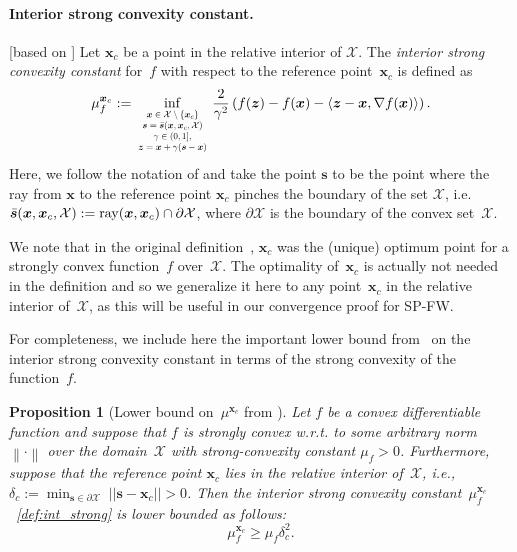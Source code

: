 \documentclass[twoside]{article}
\newcommand{\X}{\mathcal{X}}
\newcommand{\prodscal}[2]{\left\langle#1,#2\right\rangle}
\newcommand{\x}{\bm{x}}
\newcommand{\z}{\bm{z}}
\newcommand{\s}{\bm{s}}
\newtheorem{proposition}[definition]{Proposition}
\providecommand{\norm}[1]{\left\lVert#1\right\rVert}
\newcommand{\xc}{\x_c} %
\newcommand{\0}{\mathbf{0}} %
\begin{document}
  \paragraph{Interior strong convexity constant.} %
  \label{par:interior_strong_convexity_constant_}
  [based on ]
  Let $\xc$ be a point in the relative interior of $\X$.
   The \emph{interior strong convexity constant} for~$f$ with respect to the reference point~$\xc$ is defined as
    \begin{equation}
  \label{def:int_strong}
    \mu^{\xc}_f :=  \inf_{\substack{\scalebox{0.65}{
        $\begin{matrix}
                  \x \in \X \setminus \{\xc\} \\
                  \s = \bar{\s}(\x,\xc,\X) \\
                  \gamma \in (0,1], \\
                  \z = \x + \gamma(\s-\x)
        \end{matrix}$
        }}}
       \frac{2}{\gamma^2} \left(f(\z)-f(\x)- \prodscal{\z-\x}{ \nabla f(\x)}\right).
       \end{equation}
  Here, we follow the notation of  and take the point $\s$ to be the point where the ray from $\x$ to the reference point $\xc$ pinches the boundary of the set $\X$,
    i.e. $\bar{\s}(\x,\xc,\X) := {\rm ray}(\x,\xc) \cap \partial \X$, where $ \partial \X$ is the boundary of the convex set~$\X$.
    
  We note that in the original definition~, $\xc$ was the (unique) optimum point for a strongly convex function~$f$ over~$\X$. The optimality of~$\xc$ is actually not needed in the definition and so we generalize it here to any point~$\xc$ in the relative interior of~$\X$, as this will be useful in our convergence proof for SP-FW.

  For completeness, we include here the important lower bound from~ on the interior strong convexity constant in terms of the strong convexity of the function~$f$.

  \begin{proposition}[Lower bound on~$\mu^{\xc}$ from {}] \label{prop:delta}
  Let $f$ be a convex differentiable function and suppose that $f$ is strongly convex w.r.t. to some arbitrary norm $\norm{\cdot}$ over the domain~$\X$ with strong-convexity constant $\mu_f > 0$. Furthermore, suppose that the reference point $\xc$ lies in the relative interior of~$\X$, i.e.,
  $\delta_c := \min_{\s \in \partial \X}
    \; ||\s-\xc|| >0$. Then the interior strong convexity constant~$\mu^{\xc}_f$~\eqref{def:int_strong} is lower bounded as follows:
    \begin{equation} \mu^{\xc}_f \geq \mu_f \delta_c^2. \end{equation}
  \end{proposition}
\end{document}
